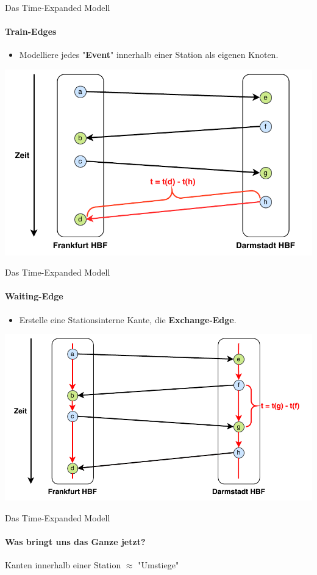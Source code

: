 \begin{frame}{Das Time-Expanded Modell}
\framesubtitle{Train-Edges}
	\begin{itemize}{}
		\item Modelliere jedes "{}\textbf{Event}"{} innerhalb einer Station als eigenen Knoten. 
	\end{itemize}

	\begin{center}
		\includegraphics[width=.72\linewidth]{images/time-expanded-basic.pdf} 
	\end{center}
\end{frame}


\begin{frame}{Das Time-Expanded Modell}
\framesubtitle{Waiting-Edge}
	\begin{itemize}
		\item Erstelle eine Stationsinterne Kante, die \textbf{Exchange-Edge}. 
	\end{itemize}

	\begin{center}
	\hspace{5em}
		\includegraphics[width=.78\linewidth]{images/time-expanded-basic-2.pdf} 
	\end{center}
\end{frame}


\begin{frame}{Das Time-Expanded Modell}
\framesubtitle{Was bringt uns das Ganze jetzt?}
\vspace{6em}
\begin{center}
	\begin{LARGE}
		Kanten innerhalb einer Station $\approx$ "{}Umstiege"{}
	\end{LARGE}
\end{center}
\end{frame}


